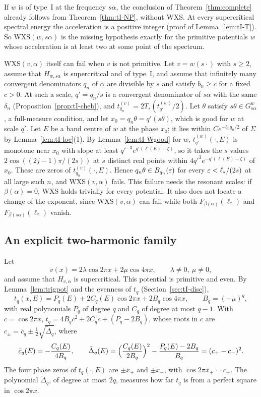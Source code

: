 If $w$ is of type~I at the frequency $s\alpha$, the conclusion of Theorem~\ref{thm:complete} already follows from Theorem~\ref{thm:tI-NP}, without WXS. At every supercritical spectral energy the acceleration is a positive integer (proof of Lemma~\ref{lem:tI-T}). So WXS$(w,s\alpha)$ is the missing hypothesis exactly for the primitive potentials $w$ whose acceleration is at least two at some point of the spectrum.

\begin{remark}\label{rem:primitive}
WXS$(v,\alpha)$ itself can fail when $v$ is not primitive. Let $v=w(s\cdot)$ with $s\ge2$, assume that $H_{w,s\alpha}$ is supercritical and of type~I, and assume that infinitely many convergent denominators $q_n$ of $\alpha$ are divisible by $s$ and satisfy $b_n\ge c$ for a fixed $c>0$. At such a scale, $q'=q_n/s$ is a convergent denominator of $s\alpha$ with the same $\delta_n$ (Proposition~\ref{prop:tI-cheb}), and $t^{(v)}_{q_n}=2T_s(t^{(w)}_{q'}/2)$. Let $\theta$ satisfy $s\theta\in G^w_{s\alpha}$, a full-measure condition, and let $x_0=q_n\theta=q'(s\theta)$, which is good for $w$ at scale $q'$. Let $E$ be a band centre of $w$ at the phase $x_0$; it lies within $Ce^{-b_nq_n/2}$ of $\Sigma$ by Lemma~\ref{lem:tI-loc}(1). By Lemma~\ref{lem:tI-Wgood} for $w$, $t^{(w)}_{q'}(\cdot,E)$ is monotone near $x_0$ with slope at least $q'^{-3}e^{q'(\ell(E)-\zeta)}$, so it takes the $s$ values $2\cos((2j-1)\pi/(2s))$ at $s$ distinct real points within $4q'^3e^{-q'(\ell(E)-\zeta)}$ of $x_0$. These are zeros of $t^{(v)}_{q_n}(\cdot,E)$. Hence $q_n\theta\in B_{q_n}(\varepsilon)$ for every $\varepsilon<\ell_*/(2s)$ at all large such $n$, and WXS$(v,\alpha)$ fails. This failure needs the resonant scales: if $\beta(\alpha)=0$, WXS holds trivially for every potential. It also does not locate a change of the exponent, since WXS$(v,\alpha)$ can fail while both $F_{\beta(\alpha)}(\ell_*)$ and $F_{\beta(s\alpha)}(\ell_*)$ vanish.
\end{remark}

\subsection{An explicit two-harmonic family}\label{sec:twoharmonic}

Let
\[
v(x)=2\lambda\cos2\pi x+2\mu\cos4\pi x,\qquad\lambda\ne0,\ \mu\ne0,
\]
and assume that $H_{v,\alpha}$ is supercritical. This potential is primitive and even. By Lemma~\ref{lem:trigpot} and the evenness of $t_q$ (Section~\ref{sec:tI-disc}),
\[
t_q(x,E)=P_q(E)+2C_q(E)\cos2\pi x+2B_q\cos4\pi x,\qquad B_q=(-\mu)^q,
\]
with real polynomials $P_q$ of degree $q$ and $C_q$ of degree at most $q-1$. With $c=\cos2\pi x$, $t_q=4B_qc^2+2C_qc+(P_q-2B_q)$, whose roots in $c$ are $c_\pm=\bar c_q\pm\frac12\sqrt{\tilde\Delta_q}$, where
\[
\bar c_q(E)=-\frac{C_q(E)}{4B_q},\qquad\tilde\Delta_q(E)=\Bigl(\frac{C_q(E)}{2B_q}\Bigr)^2-\frac{P_q(E)-2B_q}{B_q}=(c_+-c_-)^2 .
\]
The four phase zeros of $t_q(\cdot,E)$ are $\pm x_+$ and $\pm x_-$, with $\cos2\pi x_\pm=c_\pm$. The polynomial $\tilde\Delta_q$, of degree at most $2q$, measures how far $t_q$ is from a perfect square in $\cos2\pi x$.

